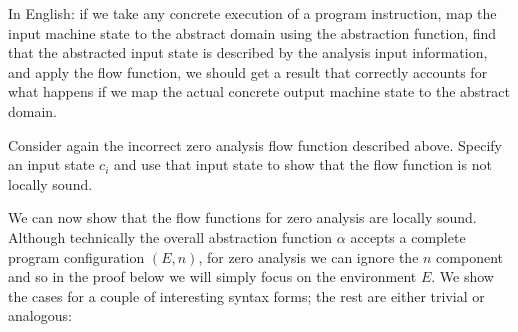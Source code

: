 \documentclass[11pt]{article}
\begin{document}

In English: if we take any concrete execution of a program instruction, map the input machine state to the abstract domain using the abstraction function, find that the abstracted input state is described by the analysis input information, and apply the flow function, we should get a result that correctly accounts for what happens if we map the actual concrete output machine state to the abstract domain.

  Consider again the incorrect zero analysis flow function described above.  Specify an input state $c_i$ and  use that input state to show that the flow function is not locally sound.


We can now show that the flow functions for zero analysis are locally sound.  Although technically the overall abstraction function $\alpha$ accepts a complete program configuration $(E,n)$, for zero analysis we can ignore the $n$ component and so in the proof below we will simply focus on the environment $E$.  We show the cases for a couple of interesting syntax forms; the rest are either trivial or analogous:\\[1ex]
\end{document}
